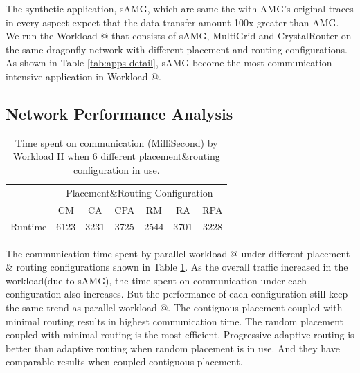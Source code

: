 \documentclass[conference,compsoc]{IEEEtran}
\makeatletter
\newcommand{\Rmnum}[1]{\expandafter\@slowromancap\romannumeral #1@}
\makeatother
\begin{document}
The synthetic application, sAMG, which are same the with AMG's original traces in every aspect expect that the data transfer amount 100x greater than AMG. We run the Workload \Rmnum{2 } that consists of sAMG, MultiGrid and CrystalRouter on the same dragonfly network with different placement and routing configurations. As shown in Table \ref{tab:apps-detail}, sAMG become the most communication-intensive application in Workload \Rmnum{2 }. 

\subsection{Network Performance Analysis}
\label{sec: workload-2 network analysis}

\begin{table}[ht]
\begin{center}
\caption{Time spent on communication (MilliSecond) by Workload II when 6 different placement\&routing configuration in use.} 
\label{tab:syn-wkld-commtime}
\begin{tabular}{l c c c c c c }
\toprule %
\toprule
&\multicolumn{6}{c}{Placement\&Routing Configuration} \\ %
\cmidrule(l){2-7}
	 & CM & CA & CPA & RM & RA & RPA \\ %
\midrule %
Runtime  &  6123 & 3231 & 3725 & 2544 & 3701 & 3228 \\ %

\midrule %
\bottomrule %
\end{tabular}
\end{center}
\end{table}


The communication time spent by parallel workload \Rmnum{2} under different placement \& routing configurations shown in Table \ref{tab:syn-wkld-commtime}. As the overall traffic increased in the workload(due to sAMG), the time spent on communication under each configuration also increases. But the performance of each configuration still keep the same trend as parallel workload \Rmnum{1}. The contiguous placement coupled with minimal routing results in highest communication time. The random placement coupled with minimal routing is the most efficient. Progressive adaptive routing is better than adaptive routing when random placement is in use. And they have comparable results when coupled contiguous placement. 
\end{document}
